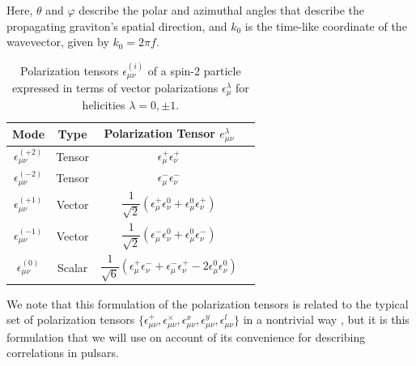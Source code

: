 \documentclass[prd,aps,psfig,nofootinbib,nobibnotes,superscriptaddress,preprintnumbers,times]{revtex4-2}\setlength{\topmargin}{-14mm}
\begin{document}
Here, $\theta$ and $\varphi$ describe the polar and azimuthal angles that describe the propagating graviton's spatial direction, and $k_0$ is the time-like coordinate of the wavevector, given by $k_0 = 2\pi f$. 
\begin{table}[h] 
\centering
\renewcommand{\arraystretch}{1.8}
\begin{tabular}{|c|c|c|l|}
\hline
\textbf{Mode} & \textbf{Type} & \textbf{Polarization Tensor $e^{\lambda}_{\mu\nu}$} \\
\hline
$\epsilon^{(+2)}_{\mu\nu}$     & Tensor  & $\epsilon^+_\mu \epsilon^+_\nu $ \\
\hline
$\epsilon^{(-2)}_{\mu\nu}$     & Tensor   & $\epsilon^-_\mu \epsilon^-_\nu $ \\
\hline
$\epsilon^{(+1)}_{\mu\nu}$     & Vector   & $\dfrac{1}{\sqrt{2}} \left( \epsilon^+_\mu \epsilon^0_\nu + \epsilon^0_\mu \epsilon^+_\nu \right)$ \\
\hline
$\epsilon^{(-1)}_{\mu\nu}$     & Vector   & $\dfrac{1}{\sqrt{2}} \left( \epsilon^-_\mu \epsilon^0_\nu + \epsilon^0_\mu \epsilon^-_\nu \right)$ \\
\hline
$\epsilon^{(0)}_{\mu\nu}$      & Scalar  & $\dfrac{1}{\sqrt{6}} \left( \epsilon^+_\mu \epsilon^-_\nu + \epsilon^-_\mu \epsilon^+_\nu - 2\epsilon^0_\mu \epsilon^0_\nu \right)$ \\
\hline
\end{tabular}
\caption{Polarization tensors $\epsilon^{(i)}_{\mu\nu}$ of a spin-2 particle expressed in terms of vector polarizations $\epsilon^\lambda_\mu$ for helicities $\lambda = 0, \pm1$.}
\label{tbl:tensors}
\end{table}
We note that this formulation of the polarization tensors is related to the typical set of polarization tensors $\{\epsilon_{\mu\nu}^+, \epsilon_{\mu\nu}^\times, \epsilon_{\mu\nu}^x, \epsilon_{\mu\nu}^y, \epsilon_{\mu\nu}^l \}$ in a nontrivial way \cite{Liang:2021bct}, but it is this formulation that we will use on account of its convenience for describing correlations in pulsars.
\end{document}
